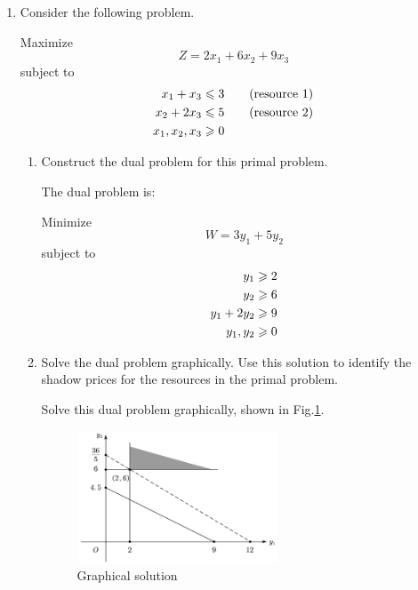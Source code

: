 \documentclass[a4paper]{article}
\begin{document}
\courseheader
{}

\begin{enumerate}
  \setlength{\itemsep}{3\parskip}

  \item Consider the following problem.
  
  Maximize $$Z=2x_1+6x_2+9x_3$$
  subject to
  \begin{equation*}
  \begin{aligned}
  x_1+x_3&\leqslant 3\qquad\text{(resource 1)}\\
  x_2+2x_3&\leqslant 5\qquad\text{(resource 2)}\\
  x_1,x_2,x_3&\geqslant 0\\
  \end{aligned}
  \end{equation*}

\begin{enumerate}
	\item Construct the dual problem for this primal problem.
	
	\begin{solution}
		The dual problem is:
		
		  Minimize $$W=3y_1+5y_2$$
		subject to
		\begin{equation*}
		\begin{aligned}
		y_1&\geqslant 2\\
		y_2&\geqslant 6\\
		y_1+2y_2&\geqslant 9\\
		y_1,y_2&\geqslant 0
		\end{aligned}
		\end{equation*}		
		
	\end{solution}
	
	\item Solve the dual problem graphically. Use this solution to identify the shadow prices for the resources in the primal problem.
	
	\begin{solution}
		Solve this dual problem graphically, shown in Fig.\ref{f1}.
		  \begin{figure}[htbp]
			\centering
			\includegraphics[width = 0.6\textwidth]{f1}
			\caption{Graphical solution}
			\label{f1}
		\end{figure}
	

\end{solution}
\end{enumerate}
\end{enumerate}
\end{document}
